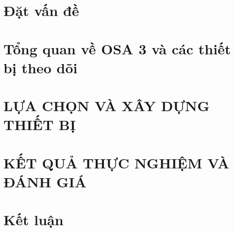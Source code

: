 \documentclass[12pt,a4paper,oneside]{book} %
\renewcommand\thechapter{\arabic{chapter}}
\begin{document}
\renewcommand{\thelstlisting}{\thechapter.\arabic{lstlisting}}

\renewcommand{\thedefinition}{\thechapter.\arabic{definition}}




\pagestyle{plain}
\frontmatter


\tableofcontents


\renewcommand{\listfigurename}{Danh sách hình vẽ}
\renewcommand{\listtablename}{Danh sách bảng}

\listoffigures
{}

\listoftables
{}


\mainmatter


\changefontsizes[16pt]{13pt}
\chapter*{Đặt vấn đề}
\thispagestyle{empty}


\chapter{Tổng quan về OSA 3 và các thiết bị theo dõi \label{background_section}}


\chapter{LỰA CHỌN VÀ XÂY DỰNG THIẾT BỊ\label{the_proposed_method_section}}


\chapter{KẾT QUẢ THỰC NGHIỆM VÀ ĐÁNH GIÁ}


% 
\chapter{Kết luận}



% 



% 



\newpage
\printbibliography
\end{document}
